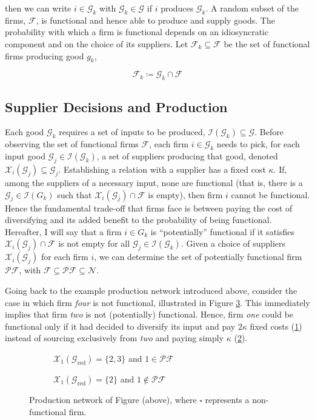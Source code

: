 \documentclass[american, abstract=on]{scrartcl}
\newcommand{\inputTikZ}[2]{%
      \scalebox{#1}{}  
    }
\newcommand{\F}{\mathcal{F}}
\newcommand{\X}{\mathcal{X}}
\newcommand{\G}{\mathcal{G}}
\newcommand{\I}{\mathcal{I}}
\newcommand{\N}{\mathcal{N}}
\newcommand{\PF}{\mathcal{P} \F}
\begin{document}
then we can write $i \in \G_k$ with $\G_k \in \G$ if $i$ produces $\G_k$. A random subset of the firms, $\F$, is functional and hence able to produce and supply goods. The probability with which a firm is functional depends on an idiosyncratic component and on the choice of its suppliers. Let $\F_k \subseteq \F$ be the set of functional firms producing good $g_k$,

\begin{equation}
  \F_k \coloneqq \G_k \cap \F
\end{equation}

\subsection{Supplier Decisions and Production}

Each good $\G_k$ requires a set of inputs to be produced, $\mathcal{I}(\G_k) \subseteq \G$. Before observing the set of functional firms $\F$, each firm $i \in \G_k$ needs to pick, for each input good $\G_j \in \mathcal{I}(\G_k)$, a set of suppliers producing that good, denoted $\X_i(\G_j) \subseteq \G_j$. Establishing a relation with a supplier has a fixed cost $\kappa$. If, among the suppliers of a necessary input, none are functional (that is, there is a $\G_j \in \I(G_k)$ such that $\X_i(\G_j) \cap \F$ is empty), then firm $i$ cannot be functional. Hence the fundamental trade-off that firms face is between paying the cost of diversifying and its added benefit to the probability of being functional. Hereafter, I will say that a firm $i \in G_k$ is ``potentially'' functional if it satisfies $\X_i(\G_j) \cap \F$ is not empty for all $\G_j \in \I(\G_k)$. Given a choice of suppliers $\X_i(\G_j)$ for each firm $i$, we can determine the set of potentially functional firm $\PF$, with $\F \subseteq \PF \subseteq \N$.

Going back to the example production network introduced above, consider the case in which firm \textit{four} is not functional, illustrated in Figure \ref{fig:functional_example}. This immediately implies that firm \textit{two} is not (potentially) functional. Hence, firm \textit{one} could be functional only if it had decided to diversify its input and pay $2\kappa$ fixed costs (\ref{fig:functional_example:yes}) instead of sourcing exclusively from \textit{two} and paying simply $\kappa$ (\ref{fig:functional_example:no}).

\begin{figure}[H]
  \centering
  \begin{subfigure}{.5\textwidth}
    \centering
    \inputTikZ{0.5}{../diagrams/example-functional.tikz} 
    \caption{$\X_1(\G_{\text{red}}) = \{2, 3\}$ and $1 \in \PF$}
    \label{fig:functional_example:yes}  
  \end{subfigure}%
  \begin{subfigure}{.5\textwidth}
    \centering
    \inputTikZ{0.5}{../diagrams/example-notfunctional.tikz} 
    \caption{$\X_1(\G_{\text{red}}) = \{2\}$ and $1 \notin \PF$}
    \label{fig:functional_example:no}
  \end{subfigure}
  \caption{Production network of Figure (above), where $\square$ represents a non-functional firm.}
  \label{fig:functional_example}
\end{figure}
\end{document}
